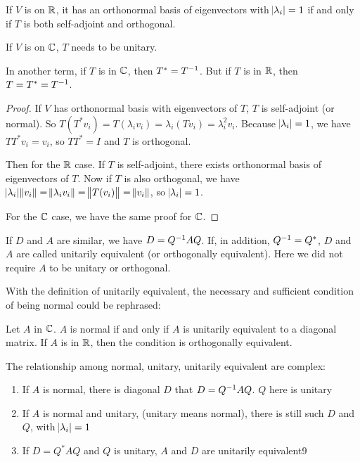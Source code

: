 \begin{theorem}
    If $V$ is on $\mathbb{R}$, it has an orthonormal basis of eigenvectors with $\abs{\lambda_i} = 1$ if and only if $T$ is both self-adjoint and orthogonal.     
    
    If $V$ is on $\mathbb{C}$, $T$ needs to be unitary.
    
    In another term, if $T$ is in $\mathbb{C}$, then $T^* = {T}^{-1}$. But if $T$ is in $\mathbb{R}$, then $T = T^* = {T}^{-1}$.
\end{theorem}
\begin{proof}
    If $V$ has orthonormal basis with eigenvectors of $T$, $T$ is self-adjoint (or normal). So $T(T^* v_i) = T (\lambda_i v_i) = \lambda_i (T v_i) = \lambda_i^2 v_i$. Because $\abs{\lambda_i} = 1$, we have $TT^* v_i = v_i$, so $TT^* = I$ and $T$ is orthogonal.
    
    Then for the $\mathbb{R}$ case. If $T$ is self-adjoint, there exists orthonormal basis of eigenvectors of $T$. Now if $T$ is also orthogonal, we have $\abs{\lambda_i} \norm{v_i} = \norm{\lambda_i v_i} = \norm{T (v_i)} = \norm{v_i}$, so $\abs{\lambda_i} = 1$. 
    
    For the $\mathbb{C}$ case, we have the same proof for $\mathbb{C}$.
\end{proof}


\begin{definition}    
    If $D$ and $A$ are similar, we have $D = {Q}^{-1} A Q$. If, in addition, ${Q}^{-1} = Q^*$, $D$ and $A$ are called unitarily equivalent (or orthogonally equivalent). Here we did not require $A$ to be unitary or orthogonal.
\end{definition}


With the definition of unitarily equivalent, the necessary and sufficient condition of being normal could be rephrased:

\begin{theorem}
    Let $A$ in $\mathbb{C}$. $A$ is normal if and only if $A$ is unitarily equivalent to a diagonal matrix. If $A$ is in $\mathbb{R}$, then the condition is orthogonally equivalent.
\end{theorem}

The relationship among normal, unitary, unitarily equivalent are complex:
\begin{enumerate}
    \item If $A$ is normal, there is diagonal $D$ that $D = {Q}^{-1} A Q$. $Q$ here is unitary
    \item If $A$ is normal and unitary, (unitary means normal), there is still such $D$ and $Q$, with $\abs{\lambda_i} = 1$
    \item If $D = Q^* A Q$ and $Q$ is unitary, $A$ and $D$ are unitarily equivalent9
\end{enumerate}

